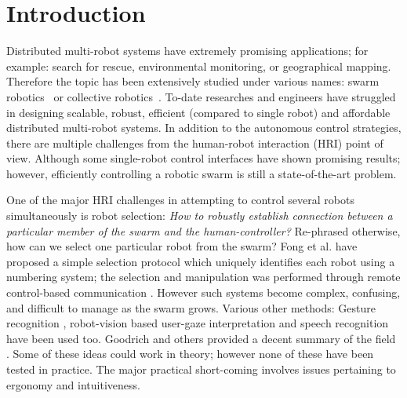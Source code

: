 \documentclass{svmult}
\begin{document}
\section{Introduction}
\label{sec:introduction}
Distributed multi-robot systems have extremely promising applications; for example: search for rescue, environmental monitoring, or geographical mapping. Therefore the topic has been extensively studied under various names: swarm robotics~\cite{brambilla2013} or collective robotics~\cite{kernbach2013handbook}. To-date researches and engineers have struggled in designing scalable, robust, efficient (compared to single robot) and affordable distributed multi-robot systems. In addition to the autonomous control strategies, there are multiple challenges from the human-robot interaction (HRI) point of view. Although some single-robot control interfaces have shown promising results; however, efficiently controlling a robotic swarm is still a state-of-the-art problem.

One of the major HRI challenges in attempting to control several robots simultaneously is robot selection: \textit{How to robustly establish connection between a particular member of the swarm and the human-controller?} Re-phrased otherwise, how can we select one particular robot from the swarm? Fong et al. have proposed a simple selection protocol which uniquely identifies each robot using a numbering system; the selection and manipulation was performed through remote control-based communication \cite{fong2003}. However such systems become complex, confusing, and difficult to manage as the swarm grows. Various other methods: Gesture recognition \cite{Nagietal2014, Jones2010, Couture-Beil2010, Monajjemi2013}, robot-vision based user-gaze interpretation \cite{Couture-Beil2010, Monajjemi2013, Pourmehr2013} and speech recognition \cite{Pourmehr2013} have been used too. Goodrich and others provided a decent summary of the field \cite{yanco2004classifying, goodrich2007human, Rule2012}. Some of these ideas could work in theory; however none of these have been tested in practice. The major practical short-coming involves issues pertaining to ergonomy and intuitiveness. 
\end{document}

